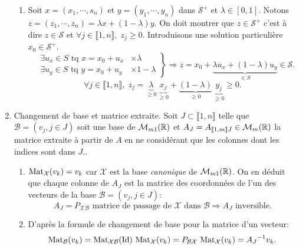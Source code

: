 \begin{enumerate}
\begin{enumerate}
    \item Soit $x=(x_1, \cdots, s_n)$ et $y=(y_1,\cdots,y_n)$ dans $\mathcal{S}^+$ et $\lambda \in [0,1]$. Notons $z=(z_1,\cdots, z_n) = \lambda x + (1-\lambda)y$. On doit montrer que $z \in \mathcal{S}^+$ c'est à dire $z \in \mathcal{S}$ et $\forall j \in \llbracket 1,n \rrbracket,\; z_j \geq 0$.\newline
Introduisons une solution particulière $x_0 \in \mathcal{S}^+$.
\[
\left.
  \begin{aligned}
    &\exists u_x \in S \text{ tq } x = x_0 + u_x &\times \lambda\\ 
    &\exists u_y \in S \text{ tq } y = x_0 + u_y &\times 1-\lambda
  \end{aligned}
\right\rbrace \Rightarrow 
z = x_0 + \underset{\in S}{\underbrace{\lambda u_x + (1-\lambda)u_y}}
\in \mathcal{S}.
\]
\[
  \forall j \in \llbracket 1,n \rrbracket,\; z_j = \underset{\geq 0}{\underbrace{\lambda}} \,\underset{\geq 0}{\underbrace{x_j}}
  + \underset{\geq 0}{\underbrace{(1-\lambda)}} \,\underset{\geq 0}{\underbrace{y_j}} \geq 0.
\]
  \end{enumerate}

  \item Changement de base et matrice extraite.\newline
Soit $J \subset \llbracket 1, n \rrbracket$ telle que $\mathcal{B} = \left(v_j , j\in J \right)$ soit une base de $\mathcal{M}_{m 1 }(\mathbb{R})$ et $A_J = A_{\llbracket 1,m\rrbracket J} \in \mathcal{M}_m(\mathbb{R})$ la matrice extraite à partir de $A$ en ne considérant que les colonnes dont les indices sont dans $J$..
  \begin{enumerate}
    \item $\operatorname{Mat}_{\mathcal{X}}(v_k) = v_k$ car $\mathcal{X}$ est la base \emph{canonique} de $\mathcal{M}_{m 1}(\mathbb{R})$. On en déduit que chaque colonne de $A_J$ est la matrice des coordonnées de l'un des vecteurs de la base $\mathcal{B} = \left(v_j , j\in J \right)$: 
\[
  A_J = P_{\mathcal{X} \mathcal{B}} \text{ matrice de passage de } \mathcal{X} \text{ dans } \mathcal{B}
  \Rightarrow A_J \text{ inversible}.
\]

    \item D'après la formule de changement de base pour la matrice d'un vecteur:
\[
  \operatorname{Mat}_{\mathcal{B}}(v_k) = \operatorname{Mat}_{\mathcal{X} \mathcal{B}}(\operatorname{Id})\,\operatorname{Mat}_{\mathcal{X}}(v_k) 
  = P_{\mathcal{B} \mathcal{X}}\, \operatorname{Mat}_{\mathcal{X}}(v_k)
  = {A_J}^{-1} v_k.
\]

  \end{enumerate}
\end{enumerate}
\newpage

